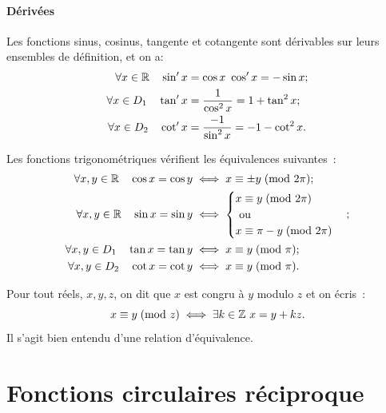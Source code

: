 \paragraph{Dérivées}
Les fonctions sinus, cosinus, tangente et cotangente sont dérivables sur leurs 
ensembles de définition, et on a:
\begin{align}
    \forall x \in \mathbb{R} \quad \sin'x &=\cos x \ \cos'x=-\sin x; \\
    \forall x \in D_1 \quad \tan'x &=\frac{1}{\cos^2 x}=1+\tan^2 x; \\
    \forall x \in D_2 \quad \cot'x &=\frac{-1}{\sin^2 x}=-1-\cot^2 x.
\end{align}
\begin{prop}
    Les fonctions trigonométriques vérifient les équivalences suivantes~:
    \begin{align}
        \forall x, y \in \mathbb{R} \quad \cos x = \cos y &\iff x \equiv \pm 
        y\!\pmod {2\pi};\\
        \forall x, y \in \mathbb{R} \quad \sin x = \sin y &\iff
        \begin{cases}            
            x \equiv y\!\pmod {2\pi} \\ \text{~ou~} \\
            x \equiv \pi-y\!\pmod {2\pi}
        \end{cases};\\
        \forall x, y \in D_1 \quad \tan x = \tan y &\iff x \equiv y\!\pmod {\pi};\\
        \forall x, y \in D_2 \quad \cot x = \cot y &\iff x \equiv y\!\pmod {\pi}.
    \end{align}
\end{prop}
\begin{defdef}[Congruence]
    Pour tout réels, \(x, y, z\), on dit que \(x\) est congru à \(y\) modulo 
    \(z\) et on écris~:
    \begin{equation}
        x \equiv y\!\pmod {z} \iff \exists k \in \mathbb{Z} \ x = y + kz.
    \end{equation}
    Il s'agit bien entendu d'une relation d'équivalence.
\end{defdef}
\section{Fonctions circulaires réciproque}
\label{sec:chap1-fonctionscircréciproques}

